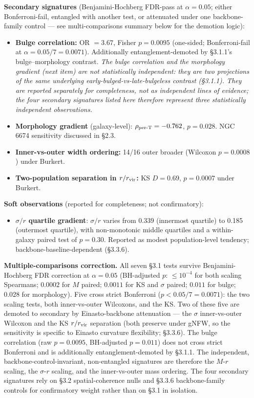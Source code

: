 \documentclass[linenumbers,trackchanges]{aastex701}
\begin{document}
\textbf{Secondary signatures} (Benjamini-Hochberg FDR-pass at $\alpha = 0.05$; either Bonferroni-fail, entangled with another test, or attenuated under one backbone-family control --- see multi-comparisons summary below for the demotion logic):

\begin{itemize}
  \item \textbf{Bulge correlation:} OR $= 3.67$, Fisher $p = 0.0095$ (one-sided; Bonferroni-fail at $\alpha = 0.05/7 = 0.0071$). Additionally entanglement-demoted by \S3.1.1's bulge--morphology contrast. \emph{The bulge correlation and the morphology gradient (next item) are not statistically independent: they are two projections of the same underlying early-bulged-vs-late-bulgeless contrast (\S3.1.1). They are reported separately for completeness, not as independent lines of evidence; the four secondary signatures listed here therefore represent three statistically independent observations.}
  \item \textbf{Morphology gradient} (galaxy-level): $\rho_{\rm per\text{-}T} = -0.762$, $p = 0.028$. NGC 6674 sensitivity discussed in \S2.3.
  \item \textbf{Inner-vs-outer width ordering:} 14/16 outer broader (Wilcoxon $p = 0.0008$) under Burkert.
  \item \textbf{Two-population separation in $r/r_{\rm vir}$:} KS $D = 0.69$, $p = 0.0007$ under Burkert.
\end{itemize}

\textbf{Soft observations} (reported for completeness; not confirmatory):

\begin{itemize}
  \item \textbf{$\sigma/r$ quartile gradient}: $\sigma/r$ varies from 0.339 (innermost quartile) to 0.185 (outermost quartile), with non-monotonic middle quartiles and a within-galaxy paired test of $p = 0.30$. Reported as modest population-level tendency; backbone-baseline-dependent (\S3.3.6).
\end{itemize}

\textbf{Multiple-comparisons correction.} All seven \S3.1 tests survive Benjamini-Hochberg FDR correction at $\alpha = 0.05$ (BH-adjusted $p$: $\le 10^{-4}$ for both scaling Spearmans; $0.0002$ for $M$ paired; $0.0011$ for KS and $\sigma$ paired; $0.011$ for bulge; $0.028$ for morphology). Five cross strict Bonferroni ($p < 0.05/7 = 0.0071$): the two scaling tests, both inner-vs-outer Wilcoxons, and the KS. Two of these five are demoted to secondary by Einasto-backbone attenuation --- the $\sigma$ inner-vs-outer Wilcoxon and the KS $r/r_{\rm vir}$ separation (both preserve under gNFW, so the sensitivity is specific to Einasto curvature flexibility; \S3.3.6). The bulge correlation (raw $p = 0.0095$, BH-adjusted $p = 0.011$) does not cross strict Bonferroni and is additionally entanglement-demoted by \S3.1.1. The independent, backbone-control-invariant, non-entangled signatures are therefore the $M$-$r$ scaling, the $\sigma$-$r$ scaling, and the inner-vs-outer mass ordering. The four secondary signatures rely on \S3.2 spatial-coherence nulls and \S3.3.6 backbone-family controls for confirmatory weight rather than on \S3.1 in isolation.
\end{document}
